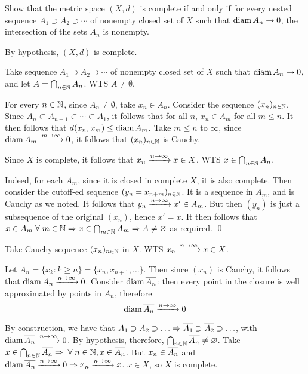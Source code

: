 \documentclass[a4paper, 10pt]{article}
\begin{document}
\begin{problem} [43.4 \done]
    Show that the metric space $(X, d)$ is complete if and only if for every nested sequence $A_1 \supset A_2 \supset \cdots$ of nonempty closed set of $X$ such that $\operatorname*{diam} A_n \to 0$, the intersection of the sets $A_n$ is nonempty.
\end{problem}
\begin{solution}
\pffwd By hypothesis, $(X, d)$ is complete.

Take sequence $A_1 \supset A_2 \supset \cdots$ of nonempty closed set of $X$ such that $\operatorname*{diam} A_n \to 0$, and let $A = \bigcap_{n \in \mathbb{N}} A_n$. WTS $A \neq \emptyset$.

For every $n \in \mathbb{N}$, since $A_n \neq \emptyset$, take $x_n \in A_n$. Consider the sequence $(x_n)_{n \in \mathbb{N}}$. Since $A_n \subset A_{n-1} \subset \cdots \subset A_1$, it follows that for all $n$, $x_n \in A_m$ for all $m \leq n$. It then follows that $d(x_n, x_m) \leq \operatorname*{diam} A_m$. Take $m \leq n$ to $\infty$, since $\operatorname*{diam} A_m \xrightarrow{m \to \infty} 0$, it follows that $(x_n)_{n \in \mathbb{N}}$ is Cauchy.

Since $X$ is complete, it follows that $x_n \xrightarrow{n \to \infty} x \in X$. WTS $x \in \bigcap_{n \in \mathbb{N}} A_n$.

Indeed, for each $A_m$, since it is closed in complete $X$, it is also complete. Then consider the cutoff-ed sequence $(y_n = x_{n + m})_{n \in \mathbb{N}}$. It is a sequence in $A_m$, and is Cauchy as we noted. It follows that $y_n \xrightarrow{n \to \infty} x' \in A_m$. But then $(y_n)$ is just a subsequence of the original $(x_n)$, hence $x' = x$. It then follows that $x \in A_m \forall m \in \bbn \implies x \in \bigcap_{m \in \bbn} A_m \implies A \neq \emptyset$ as required. \qed

\pfbwd Take Cauchy sequence $(x_n)_{n \in \mathbb{N}}$ in $X$. WTS $x_n \xrightarrow{n \to \infty} x \in X$.

Let $A_n = \{x_k : k \geq n \} = \{x_n, x_{n+1}, \ldots\}$. Then since $(x_n)$ is Cauchy, it follows that $\operatorname*{diam} A_n \xrightarrow{n \to \infty} 0$. Consider $\operatorname*{diam} \overline{A_n}$: then every point in the closure is well approximated by points in $A_n$, therefore \begin{equation*}
\operatorname*{diam} \overline{A_n} \xrightarrow{n \to \infty} 0
\end{equation*}

By construction, we have that $A_1 \supset A_2 \supset \ldots \Rightarrow \overline{A_1} \supset \overline{A_2} \supset \ldots$, with $\operatorname*{diam} \overline{A_n} \xrightarrow{n \to \infty} 0$. By hypothesis, therefore, $\bigcap_{n \in \mathbb{N}} \overline{A_n} \neq \varnothing$. Take $x \in \bigcap_{n \in \bbn} \cl{A_n} \implies \forall n \in \bbn, x \in \cl{A_n}$. But $x_n \in \overline{A_n}$ and $\operatorname*{diam} \overline{A_n} \xrightarrow{n \to \infty} 0 \Rightarrow x_n \xrightarrow{n \to \infty} x$. $x \in X$, so $X$ is complete.
\end{solution}
\end{document}
